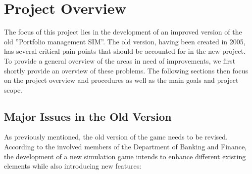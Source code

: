 \section{Project Overview}
\label{sec:project_overview}

The focus of this project lies in the development of an improved version of the old ''Portfolio management SIM''. The old version, having been created in 2005, has several critical pain points that should be accounted for in the new project. To provide a general overview of the areas in need of improvements, we first shortly provide an overview of these problems. The following sections then focus on the project overview and procedures as well as the main goals and project scope.

\subsection{Major Issues in the Old Version}
As previously mentioned, the old version of the game needs to be revised. According to the involved members of the Department of Banking and Finance, the development of a new simulation game intends to enhance different existing elements while also introducing new features:

